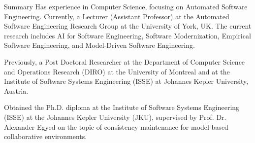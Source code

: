\prefix{}
\begin{rubric}{Summary}
\entry*[]
Has experience in Computer Science, focusing on Automated Software Engineering. Currently, a Lecturer (Assistant Professor) at the Automated Software Engineering Research Group at the University of York, UK. The current research includes AI for Software Engineering, Software Modernization, Empirical Software Engineering, and Model-Driven Software Engineering.

Previously, a Post Doctoral Researcher at the Department of Computer Science and Operations Research (DIRO) at the University of Montreal and at the Institute of Software Systems Engineering (ISSE) at Johannes Kepler University, Austria. 

Obtained the Ph.D. diploma at the Institute of Software Systems Engineering (ISSE) at the Johannes Kepler University (JKU), supervised by Prof. Dr. Alexander Egyed on the topic of consistency maintenance for model-based collaborative environments. %




\end{rubric}